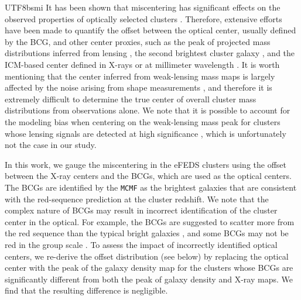 \documentclass[longauth]{aa}
\begin{document}
\begin{CJK*}{UTF8}{bsmi}
It has been shown that miscentering has significant effects on the observed properties of optically selected clusters \citep[][]{biesiadzinski12,sehgal13,rozo14a}.
Therefore, extensive efforts have been made to quantify the offset between the optical center, usually defined by the BCG, and other center proxies, such as the peak of projected mass distributions inferred from lensing \citep{oguri10,zitrin12}, the second brightest cluster galaxy \citep{hoshino15}, and the ICM-based center defined in X-rays \citep{lin04b, mahdavi13, lauer14, zhang19} or at millimeter wavelength \citep{song12b, saro15,bleem20}.
It is worth mentioning that the center inferred from weak-lensing mass maps is largely affected by the noise arising from shape measurements \citep{dietrich12}, and therefore it is extremely difficult to determine the true center of overall cluster mass distributions from observations alone.
We note that it is possible to account for the modeling bias when centering on the weak-lensing mass peak  for clusters whose lensing signals are detected at high significance \citep{sommer21}, which is unfortunately not the case in our study.


In this work, we gauge the miscentering in the eFEDS clusters using the offset between the X-ray centers and the BCGs, which are used as the optical centers.
The BCGs are identified by the \texttt{MCMF} as the brightest galaxies that are consistent with the red-sequence prediction at the cluster redshift.
We note that the complex nature of BCGs may result in incorrect identification of the cluster center in the optical.
For example, the BCGs are suggested to scatter more from the red sequence than the typical bright galaxies \citep{burg14,kravtsov18}, and some BCGs may not be red in the group scale \citep{liu12}.
To assess the impact of   incorrectly identified optical centers, we re-derive the offset distribution (see below) by replacing the optical center with the peak of the galaxy density map for the clusters whose BCGs are significantly different from both the peak of galaxy density and X-ray maps.
We find that the resulting difference is negligible.



\end{CJK*}
\end{document}
